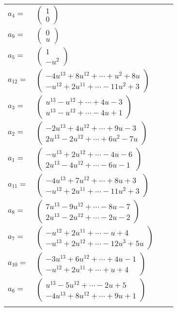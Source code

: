 \documentclass[1p]{elsarticle_modified}
\theoremstyle{definition}
\begin{document}
\begin{tabular}{m{7pt} m{180pt} m{7pt} m{180pt} }
\flushright $a_{4}=$&$\begin{pmatrix}1\\0\end{pmatrix}$ \\
\flushright $a_{9}=$&$\begin{pmatrix}0\\u\end{pmatrix}$ \\
\flushright $a_{5}=$&$\begin{pmatrix}1\\- u^2\end{pmatrix}$ \\
\flushright $a_{12}=$&$\begin{pmatrix}-4 u^{13}+8 u^{12}+\cdots+u^2+8 u\\- u^{12}+2 u^{11}+\cdots-11 u^2+3\end{pmatrix}$ \\
\flushright $a_{3}=$&$\begin{pmatrix}u^{13}- u^{12}+\cdots+4 u-3\\u^{13}- u^{12}+\cdots-4 u+1\end{pmatrix}$ \\
\flushright $a_{2}=$&$\begin{pmatrix}-2 u^{13}+4 u^{12}+\cdots+9 u-3\\2 u^{13}-2 u^{12}+\cdots+6 u^2-7 u\end{pmatrix}$ \\
\flushright $a_{1}=$&$\begin{pmatrix}- u^{13}+2 u^{12}+\cdots-4 u-6\\2 u^{13}-4 u^{12}+\cdots-6 u-1\end{pmatrix}$ \\
\flushright $a_{11}=$&$\begin{pmatrix}-4 u^{13}+7 u^{12}+\cdots+8 u+3\\- u^{12}+2 u^{11}+\cdots-11 u^2+3\end{pmatrix}$ \\
\flushright $a_{8}=$&$\begin{pmatrix}7 u^{13}-9 u^{12}+\cdots-8 u-7\\2 u^{13}-2 u^{12}+\cdots-2 u-2\end{pmatrix}$ \\
\flushright $a_{7}=$&$\begin{pmatrix}- u^{12}+2 u^{11}+\cdots- u+4\\- u^{13}+2 u^{12}+\cdots-12 u^3+5 u\end{pmatrix}$ \\
\flushright $a_{10}=$&$\begin{pmatrix}-3 u^{13}+6 u^{12}+\cdots+4 u-1\\- u^{12}+2 u^{11}+\cdots+u+4\end{pmatrix}$ \\
\flushright $a_{6}=$&$\begin{pmatrix}u^{13}-5 u^{12}+\cdots-2 u+5\\-4 u^{13}+8 u^{12}+\cdots+9 u+1\end{pmatrix}$\\&\end{tabular}
\end{document}
